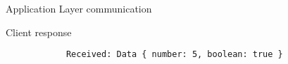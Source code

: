 \begin{frame}[fragile]{Application Layer communication}
    \begin{alertblock}{Client response}
        \begin{verbatim}
            Received: Data { number: 5, boolean: true }
        \end{verbatim}
    \end{alertblock}
\end{frame}

